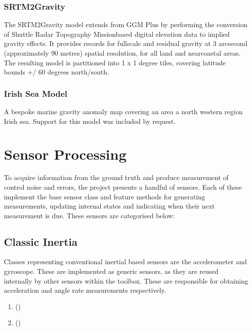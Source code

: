 \documentclass[letterpaper,10pt,english]{sphinxmanual}
\begin{document}
\subsubsection{SRTM2Gravity}
\label{\detokenize{usage/gravity_modelling:srtm2gravity}}
\sphinxAtStartPar
The SRTM2Gravity model extends from GGM Plus by performing the conversion of Shuttle Radar Topography Mission\sphinxhyphen{}based
digital elevation data to implied gravity effects. It provides records for full\sphinxhyphen{}scale and residual gravity at 3
arc\sphinxhyphen{}second (approximately 90 metres) spatial resolution, for all land and near\sphinxhyphen{}coastal areas. The resulting model is
partitioned into 1 x 1 degree tiles, covering latitude bounds +/\sphinxhyphen{} 60 degrees north/south.


\subsubsection{Irish Sea Model}
\label{\detokenize{usage/gravity_modelling:irish-sea-model}}
\sphinxAtStartPar
A bespoke marine gravity anomaly map covering an area a north western region Irish sea. Support for this model
was included by request.

\sphinxstepscope


\section{Sensor Processing}
\label{\detokenize{usage/measurement:sensor-processing}}\label{\detokenize{usage/measurement::doc}}
\sphinxAtStartPar
To acquire information from the ground truth and produce measurement of control noise and errors, the project presents
a handful of sensors. Each of these implement the base sensor class and feature methods for generating measurements,
updating internal states and indicating when their next measurement is due. These sensors are categorised below:


\subsection{Classic Inertia}
\label{\detokenize{usage/measurement:classic-inertia}}
\sphinxAtStartPar
Classes representing conventional inertial based sensors are the accelerometer and gyroscope. These are implemented
as generic sensors, as they are reused internally by other sensors within the toolbox. These are responsible for
obtaining  acceleration and angle rate measurements respectively.
\begin{enumerate}
%
\item {} 
\sphinxAtStartPar
{\hyperref[\detokenize{modules/measurement/accelerometer:accelerometer-py}]{}} ()

\item {} 
\sphinxAtStartPar
{\hyperref[\detokenize{modules/measurement/gyroscope:gyroscope-py}]{}} ()

\end{enumerate}
\end{document}
